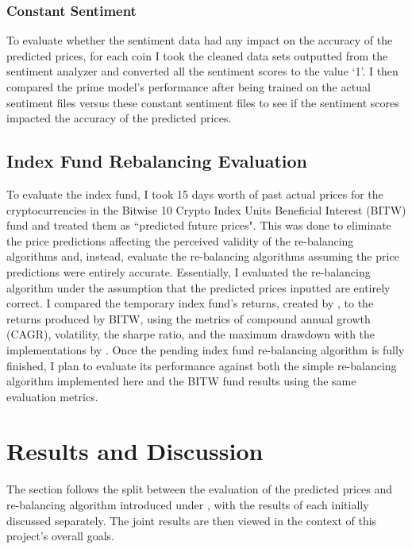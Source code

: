 \documentclass[10pt,twocolumn]{article}
\begin{document}
\subsubsection{Constant Sentiment}

To evaluate whether the sentiment data had any impact on the accuracy of the predicted prices, for each coin I took the cleaned data sets outputted from the sentiment analyzer and converted all the sentiment scores to the value `1'. I then compared the prime model's performance after being trained on the actual sentiment files versus these constant sentiment files to see if the sentiment scores impacted the accuracy of the predicted prices.

\subsection{Index Fund Rebalancing Evaluation}

To evaluate the index fund, I took 15 days worth of past actual prices for the cryptocurrencies in the Bitwise 10 Crypto Index Units Beneficial Interest (BITW) fund and treated them as ``predicted future prices". This was done to eliminate the price predictions affecting the perceived validity of the re-balancing algorithms and, instead, evaluate the re-balancing algorithms assuming the price predictions were entirely accurate. Essentially, I evaluated the re-balancing algorithm under the assumption that the predicted prices inputted are entirely correct. I compared the temporary index fund's returns, created by \textcite{algorithmictrading}, to the returns produced by BITW, using the metrics of compound annual growth (CAGR), volatility, the sharpe ratio, and the maximum drawdown with the implementations by \textcite{algorithmictrading}. Once the pending index fund re-balancing algorithm is fully finished, I plan to evaluate its performance against both the simple re-balancing algorithm implemented here and the BITW fund results using the same evaluation metrics.

\section{Results and Discussion} \label{resultsanddiscussion}

The section follows the split between the evaluation of the predicted prices and re-balancing algorithm introduced under , with the results of each initially discussed separately. The joint results are then viewed in the context of this project's overall goals.
\end{document}
